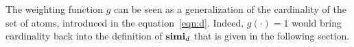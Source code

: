   The weighting function \(g\) can be seen as a generalization of the cardinality of the set of atoms, introduced in the equation~\eqref{eqn:d}.
  Indeed, \(g(\cdot) = 1\) would bring cardinality back into the definition of \(\mathbf{simi}_d\) that is given in the following section.


